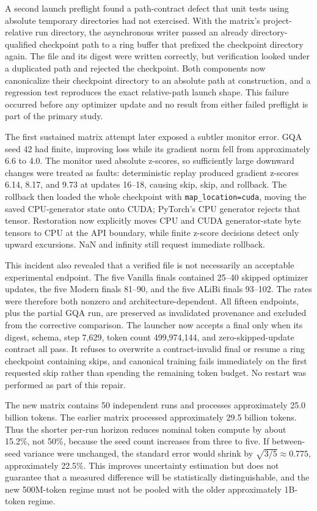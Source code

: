 \documentclass[11pt,a4paper]{article}
\theoremstyle{definition}
\theoremstyle{plain}
\begin{document}
A second launch preflight found a path-contract defect that unit tests using absolute
temporary directories had not exercised.  With the matrix's project-relative run
directory, the asynchronous writer passed an already directory-qualified checkpoint
path to a ring buffer that prefixed the checkpoint directory again.  The file and its
digest were written correctly, but verification looked under a duplicated path and
rejected the checkpoint.  Both components now canonicalize their checkpoint directory
to an absolute path at construction, and a regression test reproduces the exact
relative-path launch shape.  This failure occurred before any optimizer update and no
result from either failed preflight is part of the primary study.

The first sustained matrix attempt later exposed a subtler monitor error.  GQA seed 42
had finite, improving loss while its gradient norm fell from approximately 6.6 to 4.0.
The monitor used absolute z-scores, so sufficiently large downward changes were treated
as faults: deterministic replay produced gradient z-scores 6.14, 8.17, and 9.73 at
updates 16--18, causing skip, skip, and rollback.  The rollback then loaded the whole
checkpoint with \texttt{map\_location=cuda}, moving the saved CPU-generator state onto
CUDA; PyTorch's CPU generator rejects that tensor.  Restoration now explicitly moves
CPU and CUDA generator-state byte tensors to CPU at the API boundary, while finite
z-score decisions detect only upward excursions.  NaN and infinity still request
immediate rollback.

This incident also revealed that a verified file is not necessarily an acceptable
experimental endpoint.  The five Vanilla finals contained 25--40 skipped optimizer
updates, the five Modern finals 81--90, and the five ALiBi finals 93--102.  The rates
were therefore both nonzero and architecture-dependent.  All fifteen endpoints, plus
the partial GQA run, are preserved as invalidated provenance and excluded from the
corrective comparison.  The launcher now accepts a final only when its digest, schema,
step 7,629, token count 499,974,144, and zero-skipped-update contract all pass.  It
refuses to overwrite a contract-invalid final or resume a ring checkpoint containing
skips, and canonical training fails immediately on the first requested skip rather
than spending the remaining token budget.  No restart was performed as part of this
repair.

The new matrix contains 50 independent runs and processes approximately 25.0 billion
tokens.  The earlier matrix processed approximately 29.5 billion tokens.  Thus the
shorter per-run horizon reduces nominal token compute by about 15.2\%, not 50\%,
because the seed count increases from three to five.  If between-seed variance were
unchanged, the standard error would shrink by
$\sqrt{3/5}\approx0.775$, approximately 22.5\%.  This improves uncertainty
estimation but does not guarantee that a measured difference will be statistically
distinguishable, and the new 500M-token regime must not be pooled with the older
approximately 1B-token regime.
\end{document}

